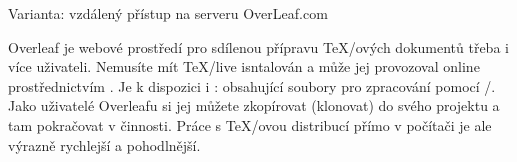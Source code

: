 {%









\secc[OverLeaf] Varianta: vzdálený přístup na serveru OverLeaf.com

Overleaf je webové prostředí pro sdílenou přípravu \TeX/ových dokumentů třeba i více uživateli. Nemusíte mít \TeX/live isntalován a může jej provozoval online prostřednictvím . Je k dispozici i \TODO:  obsahující soubory pro zpracování pomocí \OpBible/. Jako uživatelé Overleafu si jej můžete zkopírovat (klonovat) do svého projektu a tam pokračovat v činnosti. Práce s \TeX/ovou distribucí přímo v počítači je ale výrazně rychlejší a pohodlnější.






}

